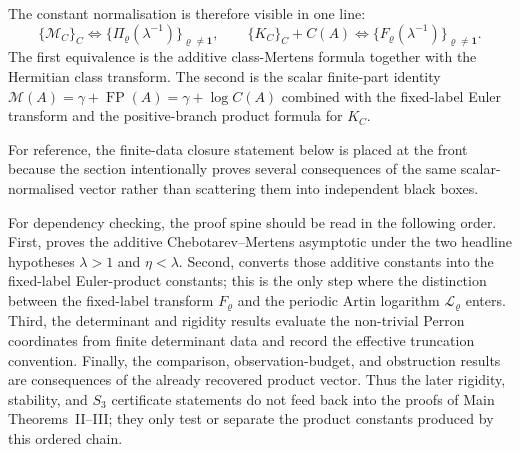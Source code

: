 \documentclass[11pt,a4paper]{amsart}
\theoremstyle{plain}
\theoremstyle{definition}
\theoremstyle{remark}
\DeclareMathOperator{\FP}{FP}
\begin{document}
The constant normalisation is therefore visible in one line:
\[
  \{\mathcal M_C\}_C
  \Longleftrightarrow
  \{\Pi_\varrho(\lambda^{-1})\}_{\varrho\ne\mathbf1},
  \qquad
  \{K_C\}_C+C(A)
  \Longleftrightarrow
  \{F_\varrho(\lambda^{-1})\}_{\varrho\ne\mathbf1}.
\]
The first equivalence is the additive class-Mertens formula together with the
Hermitian class transform.  The second is the scalar finite-part identity
\(\mathcal M(A)=\gamma+\FP(A)=\gamma+\log C(A)\) combined with the fixed-label
Euler transform and the positive-branch product formula for \(K_C\).

For reference, the finite-data closure statement below is placed at the
front because the section intentionally proves several consequences of the
same scalar-normalised vector rather than scattering them into independent
black boxes.

For dependency checking, the proof spine should be read in the following
order.  First,  proves the additive
Chebotarev--Mertens asymptotic under the two headline hypotheses
\(\lambda>1\) and \(\eta<\lambda\).  Second,
 converts
those additive constants into the fixed-label Euler-product constants; this is
the only step where the distinction between the fixed-label transform
\(F_\varrho\) and the periodic Artin logarithm \(\mathcal L_\varrho\) enters.
Third, the determinant and rigidity results evaluate the non-trivial Perron
coordinates from finite determinant data and record the effective truncation
convention.  Finally, the comparison, observation-budget, and obstruction
results are consequences of the already recovered product vector.  Thus the
later rigidity, stability, and \(S_3\) certificate statements do not feed back
into the proofs of Main Theorems~II--III; they only test or separate the
product constants produced by this ordered chain.
\end{document}
